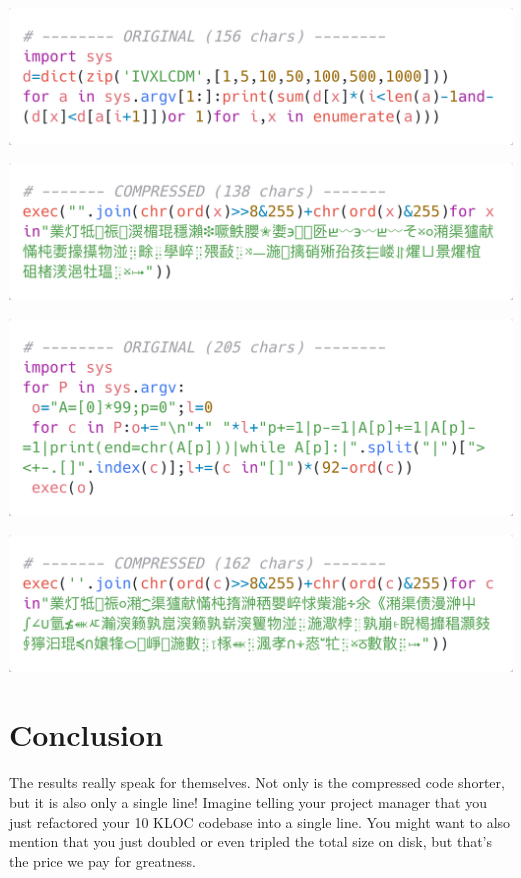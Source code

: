 \documentclass{article}
\begin{document}
\begin{tcolorbox}[boxrule=0.4pt, title=Example 2: Roman to Arabic Numerals Converter]
    \begin{multicols}{2}
        \includegraphics*[width=\linewidth]{figures/roman_before.png}

        \columnbreak

        \includegraphics*[width=\linewidth]{figures/roman_after.png}
    \end{multicols}
\end{tcolorbox}


\begin{tcolorbox}[boxrule=0.4pt, title=Example 3: Brainf*ck Interpreter]
    \begin{multicols}{2}
    \includegraphics*[width=\linewidth]{figures/brainfuck_before.png}

    \columnbreak

    \includegraphics*[width=\linewidth]{figures/brainfuck_after.png}
    \end{multicols}
\end{tcolorbox}


\section*{Conclusion}
The results really speak for themselves. Not only is the compressed code shorter, but it is also only a single line! Imagine telling your project manager that you just refactored your 10 KLOC codebase into a single line. You might want to also mention that you just doubled or even tripled the total size on disk, but that's the price we pay for greatness. 
\end{document}
